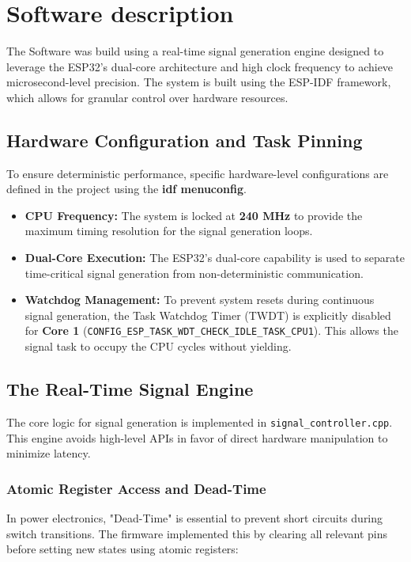 \section{Software description}

The Software was build using a real-time signal generation engine designed to leverage the 
ESP32's dual-core architecture and high clock frequency to achieve microsecond-level precision. 
The system is built using the ESP-IDF framework, which allows for granular control over hardware 
resources.


\subsection{Hardware Configuration and Task Pinning}

To ensure deterministic performance, specific hardware-level configurations are defined in the 
project using the \textbf{idf menuconfig}.

\begin{itemize}
    \item \textbf{CPU Frequency:} The system is locked at \textbf{240 MHz} to provide the maximum 
        timing resolution for the signal generation loops.

    \item \textbf{Dual-Core Execution:} The ESP32's dual-core capability is used to separate 
        time-critical signal generation from non-deterministic communication.

    \item \textbf{Watchdog Management:} To prevent system resets during continuous signal 
    generation, the Task Watchdog Timer (TWDT) is explicitly disabled for \textbf{Core 1}
    (\verb|CONFIG_ESP_TASK_WDT_CHECK_IDLE_TASK_CPU1|). This allows the signal task to occupy the 
        CPU cycles without yielding.
\end{itemize}

\subsection{The Real-Time Signal Engine}

The core logic for signal generation is implemented in \verb|signal_controller.cpp|. This engine avoids 
high-level APIs in favor of direct hardware manipulation to minimize latency.

\subsubsection{Atomic Register Access and Dead-Time}
In power electronics, "Dead-Time" is essential to prevent short circuits during switch transitions. 
The firmware implemented this by clearing all relevant pins before setting new states using atomic
registers:

